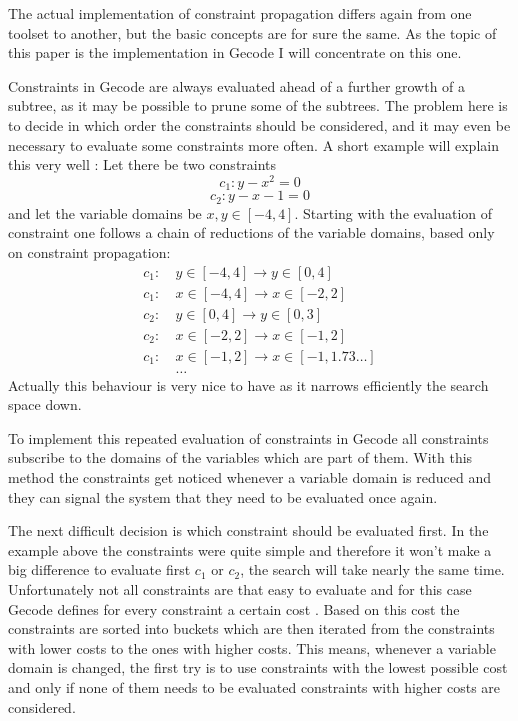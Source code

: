\documentclass[10pt,
               a4paper,
               journal,
               ]{IEEEtran}
\begin{document}
	The actual implementation of constraint propagation differs again from one toolset to another, but the basic concepts are for sure the same. As the topic of this paper is the implementation in Gecode I will concentrate on this one.
	
	Constraints in Gecode are always evaluated ahead of a further growth of a subtree, as it may be possible to prune some of the subtrees. The problem here is to decide in which order the constraints should be considered, and it may even be necessary to evaluate some constraints more often. A short example will explain this very well \cite[p.~575]{handbookCP}: Let there be two constraints 
	\begin{equation}
		c_1: y - x^2 = 0
	\end{equation}
	\begin{equation}
		c_2: y - x - 1 = 0
	\end{equation}
	and let the variable domains be $x, y \in [-4, 4]$. Starting with the evaluation of constraint one follows a chain of reductions of the variable domains, based only on constraint propagation:
	\begin{equation}
	\begin{split}
		c_1:\ &y \in [-4, 4] \rightarrow y \in [0, 4] \\
		c_1:\ &x \in [-4, 4] \rightarrow x \in [-2, 2] \\
		c_2:\ &y \in [0, 4] \rightarrow y \in [0, 3] \\
		c_2:\ &x \in [-2, 2] \rightarrow x \in [-1, 2] \\
		c_1:\ &x \in [-1, 2] \rightarrow x \in [-1, 1.73 \dots] \\
		&\dots
	\end{split}
	\end{equation}
	Actually this behaviour is very nice to have as it narrows efficiently the search space down.
	
	To implement this repeated evaluation of constraints in Gecode all constraints subscribe to the domains of the variables which are part of them. With this method the constraints get noticed whenever a variable domain is reduced and they can signal the system that they need to be evaluated once again.
	
	The next difficult decision is which constraint should be evaluated first. In the example above the constraints were quite simple and therefore it won't make a big difference to evaluate first $c_1$ or $c_2$, the search will take nearly the same time. Unfortunately not all constraints are that easy to evaluate and for this case Gecode defines for every constraint a certain cost \cite[p.~275]{programmingGecode}. Based on this cost the constraints are sorted into buckets which are then iterated from the constraints with lower costs to the ones with higher costs. This means, whenever a variable domain is changed, the first try is to use constraints with the lowest possible cost and only if none of them needs to be evaluated constraints with higher costs are considered.
	
\end{document}
